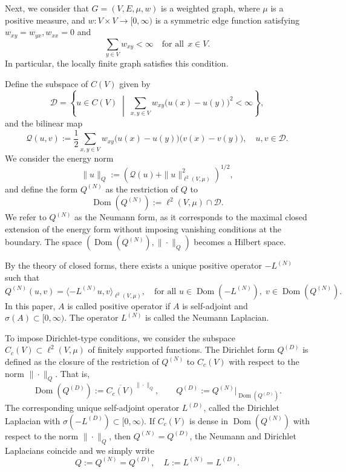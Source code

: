 \documentclass[reqno,12pt]{amsart}
\numberwithin{equation}{section}
\begin{document}
Next, we consider that $G = (V, E, \mu, w)$ is a weighted graph, where $\mu$ is a positive measure, and $w : V \times V \to [0,\infty)$ is a symmetric edge function satisfying $w_{xy} = w_{yx},w_{xx} = 0$ and 
\[\sum_{y\in V}w_{xy}<\infty \quad \text{for all}\:\:x\in V.\]
In particular, the locally finite graph satisfies this condition.

Define the subspace of $C\left(V\right)$ given by
\[\mathcal{D}=\left\{ u \in C\left(V\right) \;\middle|\; \sum_{x,y \in V} w_{xy} \bigl(u(x) - u(y)\bigr)^2 < \infty \right\},\]
and the bilinear map
\[
\mathcal{Q}(u,v) := \frac{1}{2} \sum_{x,y \in V} w_{xy} \bigl(u(x) - u(y)\bigr)\bigl(v(x) - v(y)\bigr),
\quad u,v \in \mathcal{D}.
\]
We consider the energy norm
\[
\|u\|_Q := \left( \mathcal{Q}(u) + \|u\|_{\ell^2(V,\mu)}^2 \right)^{1/2},
\]
and define the form $Q^{\left(N\right)}$ as the restriction of $Q$ to
\[
\operatorname{Dom}(Q^{(N)}) := \ell^2(V,\mu)\cap \mathcal{D}.
\]
We refer to $Q^{(N)}$ as the Neumann form, as it corresponds to the maximal closed extension of the energy form without imposing vanishing conditions at the boundary. The space $\left(\operatorname{Dom}(Q^{(N)}),\|\cdot\|_Q\right)$ becomes a Hilbert space.

By the theory of closed forms, there exists a unique positive operator $-L^{(N)}$ such that
\[
Q^{(N)}(u,v) = \langle -L^{(N)} u, v \rangle_{\ell^2(V,\mu)},
\quad \text{for all } u \in \operatorname{Dom}(-L^{(N)}),\; v \in \operatorname{Dom}(Q^{(N)}).
\]
In this paper, $A$ is called positive operator if $A$ is self-adjoint and $\sigma(A)\subset [0,\infty).$ The operator $L^{(N)}$ is called the Neumann Laplacian.
 

To impose Dirichlet-type conditions, we consider the subspace \( C_c(V) \subset \ell^2(V,\mu) \) of finitely supported functions. The Dirichlet form \( Q^{(D)} \) is defined as the closure of the restriction of \( Q^{(N)} \) to \( C_c(V) \) with respect to the norm $\|\cdot\|_Q$. That is,
\[
\operatorname{Dom}(Q^{(D)}) := \overline{C_c(V)}^{\|\cdot\|_Q}, \qquad
Q^{(D)} := Q^{(N)}\big|_{\operatorname{Dom}(Q^{(D)})}.
\]
The corresponding unique self-adjoint operator \( L^{(D)} \), called the Dirichlet Laplacian with $\sigma(-L^{(D)}) \subset [0,\infty).$ If \( C_c(V) \) is dense in \( \operatorname{Dom}(Q^{(N)}) \) with respect to the norm \( \|\cdot\|_Q \), then \( Q^{(N)} = Q^{(D)} \), the Neumann and Dirichlet Laplacians coincide and we simply write
\[
Q := Q^{(N)} = Q^{(D)}, \quad
L := L^{(N)} = L^{(D)}.
\]
\end{document}
